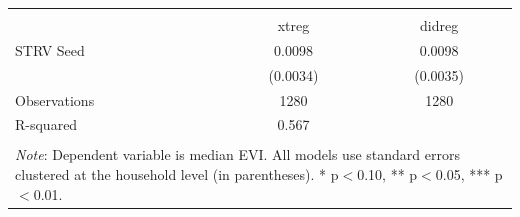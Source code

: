 \begin{tabular}{l*{2}{c}} 
\\[-1.8ex]\hline \hline \\[-1.8ex] 
& \multicolumn{1}{c}{xtreg} & 
\multicolumn{1}{c}{didreg} \\ \midrule
\midrule
STRV Seed           &      0.0098\sym{***}&      0.0098\sym{***}\\
                    &    (0.0034)         &    (0.0035)         \\
\midrule
Observations        &        1280         &        1280         \\
R-squared           &       0.567         &                     \\
\hline \hline \\[-1.8ex] 
\multicolumn{3}{p{\linewidth}}{\small 
\noindent \textit{Note}: Dependent variable 
is median EVI. All models use 
standard errors clustered at the 
household level (in parentheses). 
* p$<$0.10, ** p$<$0.05, *** p$<$0.01.} 
\end{tabular}
